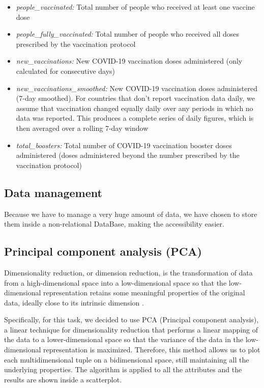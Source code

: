 \documentclass[10pt,conference]{IEEEtran}
\begin{document}
\begin{itemize}
 \item \emph{people\_vaccinated:} Total number of people who received at least one vaccine dose
 \item \emph{people\_fully\_vaccinated:} Total number of people who received all doses prescribed by the vaccination protocol
 \item \emph{new\_vaccinations:} New COVID-19 vaccination doses administered (only calculated for consecutive days)
 \item \emph{new\_vaccinations\_smoothed:} New COVID-19 vaccination doses administered (7-day smoothed). For countries that don't report vaccination data daily, we assume that vaccination changed equally daily over any periods in which no data was reported. This produces a complete series of daily figures, which is then averaged over a rolling 7-day window
 \item \emph{total\_boosters:} Total number of COVID-19 vaccination booster doses administered (doses administered beyond the number prescribed by the vaccination protocol)

 \end{itemize}

\subsection{Data management}
Because we have to manage a very huge amount of data, we have chosen to store them inside a non-relational DataBase, making the accessibility easier.

\subsection{Principal component analysis (PCA)}
Dimensionality reduction, or dimension reduction, is the transformation of data from a high-dimensional space into a low-dimensional space so that the low-dimensional representation retains some meaningful properties of the original data, ideally close to its intrinsic dimension \cite{dimRed}.

Specifically, for this task, we decided to use PCA (Principal component analysis), a linear technique for dimensionality reduction that performs a linear mapping of the data to a lower-dimensional space so that the variance of the data in the low-dimensional representation is maximized.
Therefore, this method allows us to plot each multidimensional tuple on a bidimensional space, still maintaining all the underlying properties. 
The algorithm is applied to all the attributes and the results are shown inside a scatterplot.
\end{document}
